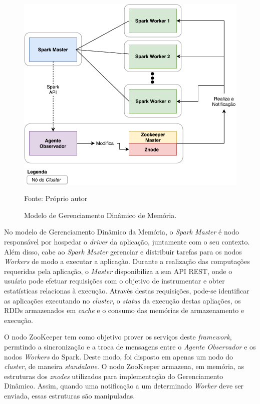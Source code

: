 \begin{figure}[!ht]
    \caption{Modelo de Gerenciamento Dinâmico de Memória.}
    \begin{center}
        \includegraphics[scale=0.9]{imagens/arquitetura-dinamica.pdf}
    \end{center}
    \small{Fonte: Próprio autor}
    \label{fig:arquitetura-dinamica}
\end{figure}

No modelo de Gerenciamento Dinâmico da Memória, o \textit{Spark Master} é nodo responsável por hospedar o \textit{driver} da aplicação, juntamente com o seu contexto. Além disso, cabe ao \textit{Spark Master} gerenciar e distribuir tarefas para os nodos \textit{Workers} de modo a executar a aplicação. Durante a realização das computações requeridas pela aplicação, o \textit{Master} disponibiliza a sua API REST, onde o usuário pode efetuar requisições com o objetivo de instrumentar e obter estatísticas relacionas à execução. Através destas requisições, pode-se identificar as aplicações executando no \textit{cluster}, o \textit{status} da execução destas apliações, os RDDs armazenados em \textit{cache} e o consumo das memórias de armazenamento e execução.

O nodo ZooKeeper tem como objetivo prover os serviços deste \textit{framework}, permtindo a sincronização e a troca de mensagens entre o \textit{Agente Observador} e os nodos \textit{Workers} do Spark. Deste modo, foi disposto em apenas um nodo do \textit{cluster}, de maneira \textit{standalone}. O nodo ZooKeeper armazena, em memória, as estruturas dos \textit{znodes} utilizados para implementação do Gerenciamento Dinâmico. Assim, quando uma notificação a um determinado \textit{Worker} deve ser enviada, essas estruturas são manipuladas.

